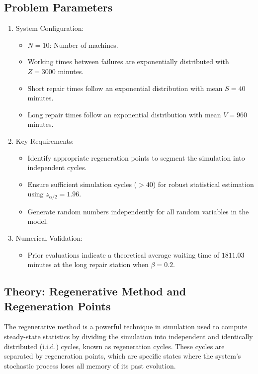\documentclass[12pt]{article}
\begin{document}
	\subsection*{Problem Parameters}
	\begin{enumerate}
		\item System Configuration:
		\begin{itemize}
			\item $N = 10$: Number of machines.
			\item Working times between failures are exponentially distributed with $Z = 3000$ minutes.
			\item Short repair times follow an exponential distribution with mean $S = 40$ minutes.
			\item Long repair times follow an exponential distribution with mean $V = 960$ minutes.
		\end{itemize}
		\item Key Requirements:
		\begin{itemize}
			\item Identify appropriate regeneration points to segment the simulation into independent cycles.
			\item Ensure sufficient simulation cycles ($> 40$) for robust statistical estimation using $z_{\alpha/2} = 1.96$.
			\item Generate random numbers independently for all random variables in the model.
		\end{itemize}
		\item Numerical Validation:
		\begin{itemize}
			\item Prior evaluations indicate a theoretical average waiting time of $1811.03$ minutes at the long repair station when $\beta = 0.2$.
		\end{itemize}
	\end{enumerate}
	
	\subsection*{Theory: Regenerative Method and Regeneration Points}
	
	The regenerative method is a powerful technique in simulation used to compute steady-state statistics by dividing the simulation into independent and identically distributed (i.i.d.) cycles, known as regeneration cycles. These cycles are separated by regeneration points, which are specific states where the system's stochastic process loses all memory of its past evolution.
	
\end{document}
